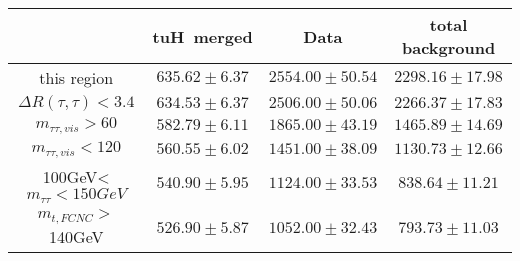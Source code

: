 \begin{tabular}{|c|c|c|c|} \hline
 & tuH~merged & Data & total background\\\hline
 this region & $635.62\pm6.37$ & $2554.00\pm50.54$ & $2298.16\pm17.98$\\\hline
$\Delta R(\tau,\tau)<3.4$ & $634.53\pm6.37$ & $2506.00\pm50.06$ & $2266.37\pm17.83$\\\hline
$m_{\tau\tau,vis}>60$ & $582.79\pm6.11$ & $1865.00\pm43.19$ & $1465.89\pm14.69$\\\hline
$m_{\tau\tau,vis}<120$ & $560.55\pm6.02$ & $1451.00\pm38.09$ & $1130.73\pm12.66$\\\hline
100GeV<$m_{\tau\tau}<150GeV$ & $540.90\pm5.95$ & $1124.00\pm33.53$ & $838.64\pm11.21$\\\hline
$m_{t,FCNC}>$140GeV & $526.90\pm5.87$ & $1052.00\pm32.43$ & $793.73\pm11.03$\\\hline
\end{tabular}
